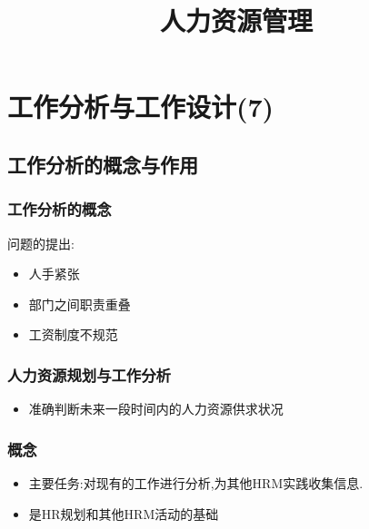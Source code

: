 \documentclass{ctexart}
\date{}
\title{人力资源管理}
\begin{document}
\maketitle
\tableofcontents


\section{工作分析与工作设计(7)}
\label{sec-1}
\subsection{工作分析的概念与作用}
\label{sec-1-1}
\subsubsection{工作分析的概念}
\label{sec-1-1-1}
问题的提出:
\begin{itemize}
\item 人手紧张
\item 部门之间职责重叠
\item 工资制度不规范
\end{itemize}
\subsubsection{人力资源规划与工作分析}
\label{sec-1-1-2}
\begin{itemize}
\item 准确判断未来一段时间内的人力资源供求状况
\end{itemize}
\subsubsection{概念}
\label{sec-1-1-3}
\begin{itemize}
\item 主要任务:对现有的工作进行分析,为其他HRM实践收集信息.
\item 是HR规划和其他HRM活动的基础
\end{itemize}
\end{document}
